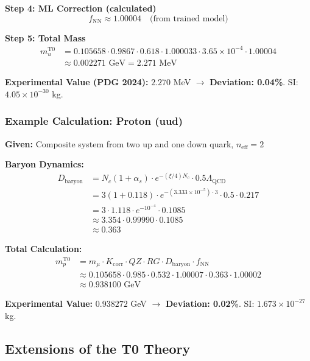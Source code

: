 	\textbf{Step 4: ML Correction (calculated)}
	\begin{equation}
		f_{\text{NN}} \approx 1.00004 \quad \text{(from trained model)}
	\end{equation}
	
	\textbf{Step 5: Total Mass}
	\begin{align}
		m_u^{\text{T0}} &= 0.105658 \cdot 0.9867 \cdot 0.618 \cdot 1.000033 \cdot 3.65 \times 10^{-4} \cdot 1.00004 \\
		&\approx 0.002271 \text{ GeV} = 2.271 \text{ MeV}
	\end{align}
	
	\textbf{Experimental Value (PDG 2024):} $2.270$ MeV $\rightarrow$ \textbf{Deviation: 0.04\%}. SI: $4.05 \times 10^{-30}$ kg.
	
	\subsubsection{Example Calculation: Proton (uud)}
	
	\textbf{Given:} Composite system from two up and one down quark, $n_{\text{eff}}=2$
	
	\textbf{Baryon Dynamics:}
	\begin{align}
		D_{\text{baryon}} &= N_c (1 + \alpha_s) \cdot e^{-(\xi/4) N_c} \cdot 0.5 \Lambda_{\text{QCD}} \\
		&= 3 (1 + 0.118) \cdot e^{-(3.333 \times 10^{-5}) \cdot 3} \cdot 0.5 \cdot 0.217 \\
		&= 3 \cdot 1.118 \cdot e^{-10^{-4}} \cdot 0.1085 \\
		&\approx 3.354 \cdot 0.99990 \cdot 0.1085 \\
		&\approx 0.363
	\end{align}
	
	\textbf{Total Calculation:}
	\begin{align}
		m_p^{\text{T0}} &= m_\mu \cdot K_{\text{corr}} \cdot QZ \cdot RG \cdot D_{\text{baryon}} \cdot f_{\text{NN}} \\
		&\approx 0.105658 \cdot 0.985 \cdot 0.532 \cdot 1.00007 \cdot 0.363 \cdot 1.00002 \\
		&\approx 0.938100 \text{ GeV}
	\end{align}
	
	\textbf{Experimental Value:} $0.938272$ GeV $\rightarrow$ \textbf{Deviation: 0.02\%}. SI: $1.673 \times 10^{-27}$ kg.

	\subsection{Extensions of the T0 Theory}
	
